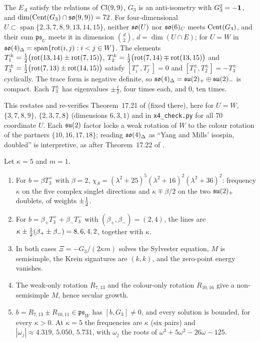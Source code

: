 \begin{proposition}
\label{d4:prop:PS}
The $E_A$ satisfy the relations of $\mathrm{Cl}(9,9)$, $G_3$ is an anti-isometry with $G_3^2=-\mathbf 1$, and $\dim(\operatorname{Cent}(G_3)\cap\mathfrak{so}(9,9))=72$. For four-dimensional
$U\subset\operatorname{span}\{2,3,7,8,9,13,14,15\}$, neither $\mathfrak{so}(U)$ nor $\mathfrak{so}(6)_C$ meets $\operatorname{Cent}(G_3)$, and their sum $\mathfrak{ps}_U$ meets it in dimension
$\binom d2$, $d=\dim(U\cap E)$; for $U=W$ in $\mathfrak{so}(4)_\Delta=\operatorname{span}\{\mathrm{rot}(i,j):i<j\in W\}$. The elements $T^\pm_1=\tfrac12\bigl(\mathrm{rot}(13,14)\pm\mathrm{rot}(7,15)\bigr)$,
$T^\pm_2=\tfrac12\bigl(\mathrm{rot}(7,14)\mp\mathrm{rot}(13,15)\bigr)$ and $T^\pm_3=\tfrac12\bigl(\mathrm{rot}(7,13)\pm\mathrm{rot}(14,15)\bigr)$ satisfy $[T^+_i,T^-_j]=0$ and
$[T^\pm_1,T^\pm_2]=-T^\pm_3$ cyclically. The trace form is negative definite, so $\mathfrak{so}(4)_\Delta=\mathfrak{su}(2)_+\oplus\mathfrak{su}(2)_-$ is compact. Each $T^\pm_3$ has
eigenvalues $\pm\tfrac i2$, four times each, and $0$, ten times.
\end{proposition}

This restates and re-verifies Theorem~17.21 of \cite{ES17} (fixed there), here for $U=W$, $\{3,7,8,9\}$, $\{2,3,7,8\}$ (dimensions $6,3,1$) and in
\texttt{x4\_check.py} for all $70$ coordinate $U$. Each $\mathfrak{su}(2)$ factor locks a weak rotation of $W$ to the colour rotation of the partners
$\{10,16,17,18\}$; reading $\mathfrak{so}(4)_\Delta$ as ``Yang and Mills' isospin, doubled'' is interpretive, as after Theorem~17.22 of \cite{ES17}.

\begin{proposition}
\label{d4:prop:so4spec}
Let $\kappa=5$ and $m=1$.
\begin{enumerate}[label=(\roman*),leftmargin=2.2em]
\item For $b=\beta T^+_3$ with $\beta=2$, $\chi_S=(\lambda^2+25)^5(\lambda^2+16)^2(\lambda^2+36)^2$: frequency $\kappa$ on the five complex singlet directions and
$\kappa\mp\beta/2$ on the two $\mathfrak{su}(2)_+$ doublets, of weights $\pm\tfrac12$.
\item For $b=\beta_+T^+_3+\beta_-T^-_3$ with $(\beta_+,\beta_-)=(2,4)$, the lines are $\kappa\pm\tfrac12(\beta_+\pm\beta_-)=8,6,4,2$, together with $\kappa$.
\item In both cases $\Xi=-G_3/(2\kappa m)$ solves the Sylvester equation, $M$ is semisimple, the Krein signatures are $(k,k)$, and the zero-point
energy vanishes.
\item The weak-only rotation $R_{7,13}$ and the colour-only rotation $R_{10,16}$ give a non-semisimple $M$, hence secular growth.
\item $b=R_{7,13}\pm R_{10,11}\in\mathfrak{ps}_W$ has $[b,G_3]\neq0$, and every solution is bounded, for every $\kappa>0$. At $\kappa=5$ the frequencies are
$\kappa$ (six pairs) and $|\omega_j|\approx4.319,\,5.050,\,5.731$, with $\omega_j$ the roots of $\omega^3+5\omega^2-26\omega-125$.
\end{enumerate}
\end{proposition}

